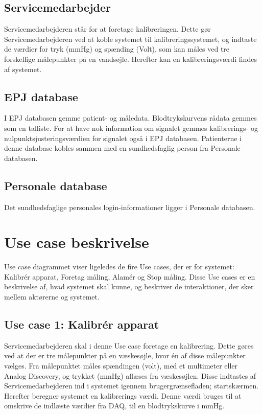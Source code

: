 \subsection{Servicemedarbejder}
Servicemedarbejderen står for at foretage kalibreringen. Dette gør Servicemedarbejderen ved at koble systemet til kalibreringssystemet, og indtaste de værdier for tryk (mmHg) og spænding (Volt), som kan måles ved tre forskellige målepunkter på en vandsøjle. Herefter kan en kalibreringsværdi findes af systemet.
\subsection{EPJ database}
I EPJ databasen gemme patient- og måledata. Blodtrykskurvens rådata gemmes som en talliste. For at have nok information om signalet gemmes kalibrerings- og nulpunktsjusteringsværdien for signalet også i EPJ databasen. Patienterne i denne database kobles sammen med en sundhedsfaglig person fra Personale databasen. 
\subsection{Personale database}
Det sundhedsfaglige personales login-informationer ligger i Personale databasen. 
\section{Use case beskrivelse}
Use case diagrammet viser ligeledes de fire Use cases, der er for systemet: Kalibrér apparat, Foretag måling, Alamér og Stop måling. Disse Use cases er en beskrivelse af, hvad systemet skal kunne, og beskriver de interaktioner, der sker mellem aktørerne og systemet.
\\
\subsection{Use case 1: Kalibrér apparat}
Servicemedarbejderen skal i denne Use case foretage en kalibrering. Dette gøres ved at der er tre målepunkter på en væskesøjle, hvor én af disse målepunkter vælges. Fra målepunktet måles spændingen (volt), med et multimeter eller Analog Discovery, og trykket (mmHg) aflæses fra væskesøjlen. Disse indtastes af Servicemedarbejderen ind i systemet igennem brugergrænsefladen; startskærmen. Herefter beregner systemet en kalibrerings værdi. Denne værdi bruges til at omskrive de indlæste værdier fra DAQ, til en blodtrykskurve i mmHg.
